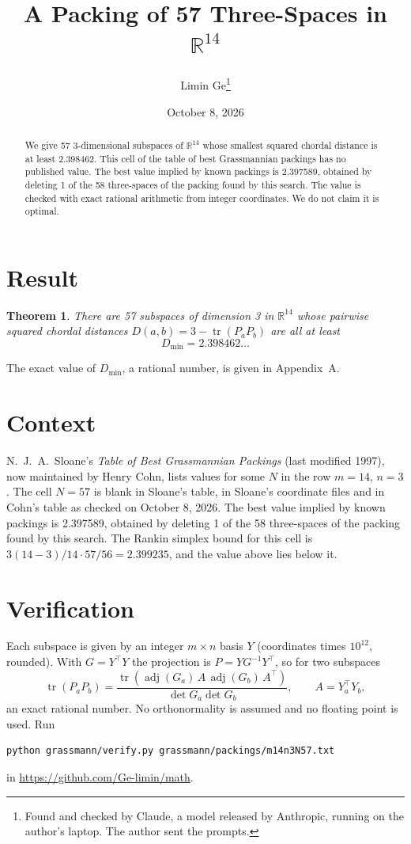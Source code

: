 \documentclass[11pt,a4paper]{article}
\title{A Packing of 57 Three-Spaces in $\mathbb{R}^{14}$}
\author{Limin Ge\thanks{Found and checked by Claude, a model released by Anthropic, running on the author's laptop. The author sent the prompts.}}
\date{October 8, 2026}
\newtheorem*{theorem}{Theorem}
\begin{document}
\maketitle
\begin{abstract}
We give 57 3-dimensional subspaces of $\mathbb{R}^{14}$ whose smallest squared chordal distance is at least 2.398462. This cell of the table of best Grassmannian packings has no published value. The best value implied by known packings is 2.397589, obtained by deleting 1 of the 58 three-spaces of the packing found by this search. The value is checked with exact rational arithmetic from integer coordinates. We do not claim it is optimal.
\end{abstract}

\section{Result}
\begin{theorem}
There are 57 subspaces of dimension 3 in $\mathbb{R}^{14}$ whose pairwise squared chordal distances $D(a,b) = 3 - \operatorname{tr}(P_aP_b)$ are all at least
\[ D_{\min} = 2.398462\ldots \]
\end{theorem}
The exact value of $D_{\min}$, a rational number, is given in Appendix~A.


\section{Context}
N.~J.~A.~Sloane's \emph{Table of Best Grassmannian Packings} (last modified 1997), now maintained by Henry Cohn, lists values for some $N$ in the row $m=14$, $n=3$. The cell $N=57$ is blank in Sloane's table, in Sloane's coordinate files and in Cohn's table as checked on October 8, 2026. The best value implied by known packings is 2.397589, obtained by deleting 1 of the 58 three-spaces of the packing found by this search. The Rankin simplex bound for this cell is $3(14-3)/14\cdot 57/56 = 2.399235$, and the value above lies below it.


\section{Verification}
Each subspace is given by an integer $m\times n$ basis $Y$ (coordinates times $10^{12}$, rounded). With $G=Y^\top Y$ the projection is $P=YG^{-1}Y^\top$, so for two subspaces
\[ \operatorname{tr}(P_aP_b)=\frac{\operatorname{tr}(\operatorname{adj}(G_a)\,A\,\operatorname{adj}(G_b)\,A^\top)}{\det G_a\det G_b},\qquad A=Y_a^\top Y_b, \]
an exact rational number. No orthonormality is assumed and no floating point is used. Run
\begin{verbatim}
python grassmann/verify.py grassmann/packings/m14n3N57.txt
\end{verbatim}
in \url{https://github.com/Ge-limin/math}.
\end{document}
